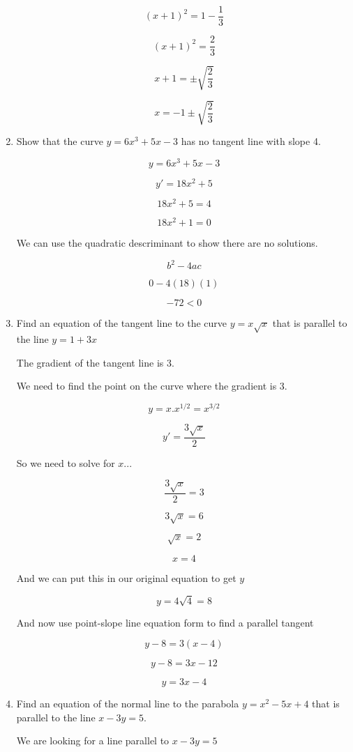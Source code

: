 \documentclass{article}
\begin{document}
\begin{enumerate}
			$$(x+1)^2 = 1 - \frac{1}{3}$$

			$$(x+1)^2 = \frac{2}{3}$$

			$$x + 1 = \pm \sqrt{\frac{2}{3}}$$

			$$x = -1 \pm \sqrt{\frac{2}{3}}$$

		\item Show that the curve $y = 6x^3 + 5x - 3$ has no tangent
			line with slope 4.


			$$y = 6x^3 + 5x - 3$$

			$$y' = 18x^2 + 5$$

			$$18x^2 + 5 = 4$$

			$$18x^2 + 1 = 0$$

			We can use the quadratic descriminant to show there are no solutions.

			$$b^2 - 4ac$$

			$$0 - 4 (18) (1)$$

			$$-72 < 0$$

		\item Find an equation of the tangent line to the curve $y = x\sqrt{x}$ that
			is parallel to the line $y = 1 + 3x$

			The gradient of the tangent line is 3.

			We need to find the point on the curve where the gradient is 3.

			$$y = x . x^{1/2} = x^{3/2}$$

			$$y' = \frac{3\sqrt{x}}{2}$$

			So we need to solve for $x$...

			$$\frac{3\sqrt{x}}{2} = 3$$

			$$3\sqrt{x} = 6$$

			$$\sqrt{x} = 2$$

			$$x = 4$$

			And we can put this in our original equation to get $y$

			$$y = 4\sqrt{4} = 8$$

			And now use point-slope line equation form to find a parallel tangent

			$$y - 8 = 3(x - 4)$$

			$$y - 8 = 3x - 12$$

			$$y = 3x - 4$$

		\item Find an equation of the normal line to the parabola $y = x^2 - 5x + 4$ that
			is parallel to the line $x - 3y = 5$.

			We are looking for a line parallel to $x - 3y = 5$


\end{enumerate}
\end{document}
